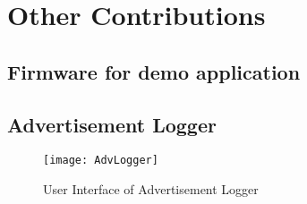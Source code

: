 \chapter{Other Contributions}

\section{Firmware for demo application}



\section{Advertisement Logger}
\begin{figure}[h]
\texttt{[image: AdvLogger]}
\caption{User Interface of Advertisement Logger}
\end{figure}
